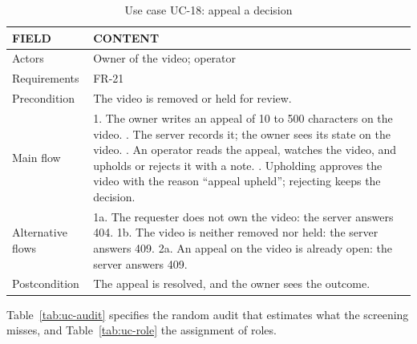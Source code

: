 \begin{table}[H]
\centering
\caption{Use case UC-18: appeal a decision}
\label{tab:uc-appeal}
\small
\begin{tabularx}{\textwidth}{p{} X}
\toprule
\textbf{FIELD} & \textbf{CONTENT} \\
\midrule
Actors & Owner of the video; operator \\
Requirements & FR-21 \\
Precondition & The video is removed or held for review. \\
Main flow &
  1. The owner writes an appeal of 10 to 500 characters on the video. \newline
  2. The server records it; the owner sees its state on the video. \newline
  3. An operator reads the appeal, watches the video, and upholds or rejects it with a note. \newline
  4. Upholding approves the video with the reason ``appeal upheld''; rejecting keeps the decision. \\
Alternative flows &
  1a. The requester does not own the video: the server answers 404. \newline
  1b. The video is neither removed nor held: the server answers 409. \newline
  2a. An appeal on the video is already open: the server answers 409. \\
Postcondition & The appeal is resolved, and the owner sees the outcome. \\
\bottomrule
\end{tabularx}
\end{table}

Table~\ref{tab:uc-audit} specifies the random audit that estimates what the screening misses, and
Table~\ref{tab:uc-role} the assignment of roles.

